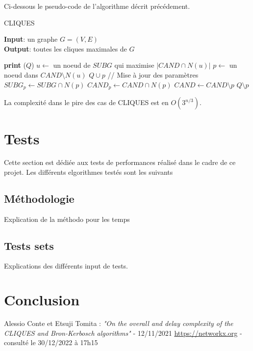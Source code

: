\documentclass[a4paper, 12pt]{article}
\begin{document}
Ci-dessous le pseudo-code de l'algorithme décrit précédement.
\begin{algorithm}
  \caption{CLIQUES}
  \textbf{Input}: un graphe $G = (V,E)$\\
  \textbf{Output}: toutes les cliques maximales de $G$
  \begin{algorithmic}[1]
       
        \State \textbf{print} ($ Q $)
      \Else
        \State $u \gets$ un noeud de $SUBG$ qui maximise $|CAND \cap N(u)|$
          \State $p \gets$ un noeud dans $CAND \setminus N(u)$
          \State $ Q \cup p $ 
          \State // Mise à jour des paramètres
          \State $SUBG_p \gets SUBG \cap N(p)$
          \State $CAND_p \gets CAND \cap N(p)$
          \State {}
          \State $CAND \gets CAND \setminus {p}$
          \State $ Q \setminus p $ 
        \EndWhile
      \EndIf
    \EndProcedure
    \State {}
  \end{algorithmic}
\end{algorithm}

La complexité dans le pire des cas de CLIQUES est en $ O(3^{n/3}) $\cite{contetomita}.

\section{Tests}%
\label{sec:tests}
Cette section est dédiée aux tests de performances réalisé dans le cadre de ce projet. Les différents elgorithmes testés sont les suivants

\subsection{Méthodologie}%
\label{subsec:methodo}
Explication de la méthodo pour les temps

\subsection{Tests sets}%
\label{subsec:sets}

Explications des différents input de tests.


\section{Conclusion}


\newpage
\begin{thebibliography}{unsrt}
 Alessio Conte et Etsuji Tomita :  \textit{"On the overall and delay complexity of the CLIQUES and Bron-Kerbosch algorithms"} -  12/11/2021
 \url{https://networkx.org} - consulté le 30/12/2022 à 17h15
\end{thebibliography}
\end{document}
